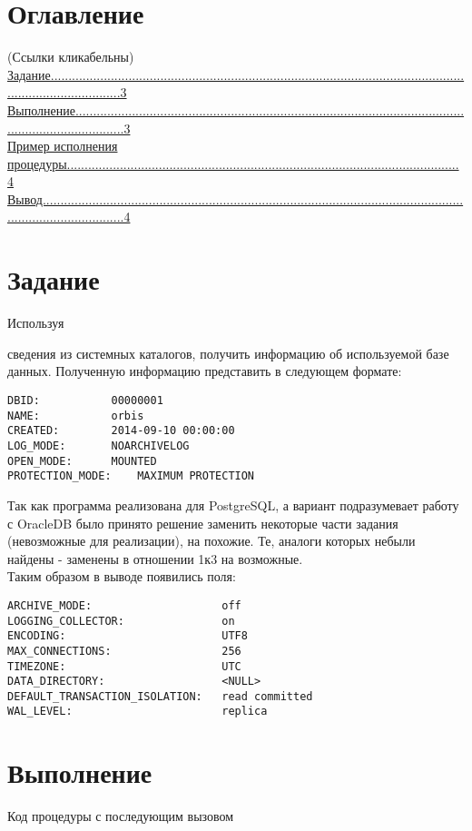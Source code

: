 \section{Оглавление}
(Ссылки кликабельны)\\
\hyperlink{p1}{Задание.....................................................................................................................................................3}\\
\hyperlink{p2}{Выполнение...............................................................................................................................................3}\\
\hyperlink{p3}{Пример исполнения процедуры...............................................................................................................4}\\
\hyperlink{p4}{Вывод........................................................................................................................................................4}\\
\newpage
\section{Задание}

\hypertarget{p1}{Используя}сведения из системных каталогов, получить информацию об используемой базе данных. Полученную информацию представить в следующем формате:
\begin{verbatim}
DBID: 			00000001
NAME:			orbis
CREATED:		2014-09-10 00:00:00
LOG_MODE:		NOARCHIVELOG
OPEN_MODE:		MOUNTED
PROTECTION_MODE:	MAXIMUM PROTECTION
\end{verbatim}

Так как программа реализована для PostgreSQL, а вариант подразумевает работу с OracleDB было принято решение заменить некоторые части задания (невозможные для реализации), на похожие. Те, аналоги которых небыли найдены - заменены в отношении 1к3 на возможные. \\
Таким образом в выводе появились поля:
\begin{verbatim}
ARCHIVE_MODE:                    off
LOGGING_COLLECTOR:               on
ENCODING:                        UTF8
MAX_CONNECTIONS:                 256
TIMEZONE:                        UTC
DATA_DIRECTORY:                  <NULL>
DEFAULT_TRANSACTION_ISOLATION:   read committed
WAL_LEVEL:                       replica
\end{verbatim}

\section{Выполнение}
\hypertarget{p2}{Код процедуры с последующим вызовом}

